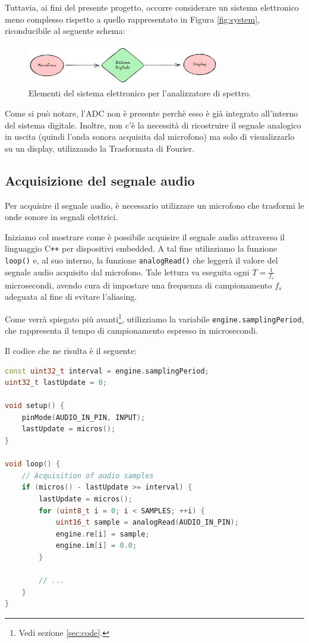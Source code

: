 \documentclass[a4paper,12pt]{report}  %
\newcommand{\lstinlinebg}[1]{\colorbox{backcolour}{\lstinline|#1|}}
\begin{document}
Tuttavia, ai fini del presente progetto, occorre considerare un sistema elettronico meno complesso rispetto a quello rappresentato in Figura \ref{fig:system}, riconducibile al seguente schema:

\begin{figure}[h]
    \centering
    \includegraphics[width=0.75\textwidth]{imgs/electronics-system-elements-fft.png}
    \caption{Elementi del sistema elettronico per l'analizzatore di spettro.}
    \label{fig:easy_system}
\end{figure}

Come si può notare, l'ADC non è presente perchè esso è già integrato all'interno del sistema digitale.
Inoltre, non c'è la necessità di ricostruire il segnale analogico in uscita (quindi l'onda sonora acquisita dal microfono) ma solo di visualizzarlo su un display, utilizzando la Trasformata di Fourier.

\subsection{Acquisizione del segnale audio}\label{sec:acquisition}
Per acquisire il segnale audio, è necessario utilizzare un microfono che trasformi le onde sonore in segnali elettrici.

Iniziamo col mostrare come è possibile acquisire il segnale audio attraverso il linguaggio C\texttt{++} per dispositivi embedded.
A tal fine utilizziamo la funzione \lstinlinebg{loop()} e, al suo interno, la funzione \lstinlinebg{analogRead()} che leggerà il valore del segnale audio acquisito dal microfono.
Tale lettura va eseguita ogni $T = \frac{1}{f_s}$ microsecondi, avendo cura di impostare una frequenza di campionamento $f_s$ adeguata al fine di evitare l'aliasing.

Come verrà spiegato più avanti\footnote{Vedi sezione \ref{sec:code}.}, utilizziamo la variabile \lstinlinebg{engine.samplingPeriod}, che rappresenta il tempo di campionamento espresso in microsecondi.

Il codice che ne risulta è il seguente:

\begin{lstlisting}[language=C++,keywords={const, uint8_t, if, for, void, Serial, begin, uint16_t, analogRead, println, uint32_t, micros, pinMode, INPUT}]
const uint32_t interval = engine.samplingPeriod;
uint32_t lastUpdate = 0;

void setup() {
    pinMode(AUDIO_IN_PIN, INPUT);
    lastUpdate = micros();
}

void loop() {
    // Acquisition of audio samples
    if (micros() - lastUpdate >= interval) {
        lastUpdate = micros();
        for (uint8_t i = 0; i < SAMPLES; ++i) {
            uint16_t sample = analogRead(AUDIO_IN_PIN);
            engine.re[i] = sample;
            engine.im[i] = 0.0;
        }

        // ...
    }
}
\end{lstlisting}
\end{document}
